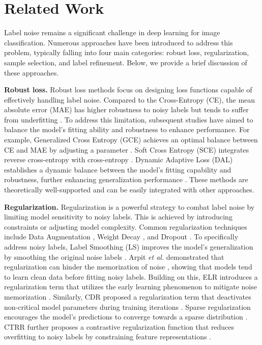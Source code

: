 \section{Related Work}
\label{sec2}
Label noise remains a significant challenge in deep learning for image classification. Numerous approaches have been introduced to address this problem, typically falling into four main categories: robust loss, regularization, sample selection, and label refinement. Below, we provide a brief discussion of these approaches.

\textbf{Robust loss.} Robust loss methods focus on designing loss functions capable of effectively handling label noise. Compared to the Cross-Entropy (CE), the mean absolute error (MAE) has higher robustness to noisy labels but tends to suffer from underfitting \citep{ghosh2017robust}. To address this limitation, subsequent studies have aimed to balance the model’s fitting ability and robustness to enhance performance. For example, Generalized Cross Entropy (GCE) achieves an optimal balance between CE and MAE by adjusting a parameter \citep{zhang2018generalized}. Soft Cross Entropy (SCE) integrates reverse cross-entropy with cross-entropy \citep{wang2019symmetric}. Dynamic Adaptive Loss (DAL) establishes a dynamic balance between the model’s fitting capability and robustness, further enhancing generalization performance \citep{li2023dynamics}. These methods are theoretically well-supported and can be easily integrated with other approaches.

\textbf{Regularization.} Regularization is a powerful strategy to combat label noise by limiting model sensitivity to noisy labels. This is achieved by introducing constraints or adjusting model complexity. Common regularization techniques include Data Augmentation \citep{shorten2019survey}, Weight Decay \citep{krogh1991simple}, and Dropout \citep{srivastava2014dropout}. To specifically address noisy labels, Label Smoothing (LS) improves the model’s generalization by smoothing the original noise labels \citep{szegedy2016rethinking}. Arpit \textit{et al.} demonstrated that regularization can hinder the memorization of noise \citep{arpit2017closer}, showing that models tend to learn clean data before fitting noisy labels. Building on this, ELR introduces a regularization term that utilizes the early learning phenomenon to mitigate noise memorization \citep{liu2020early}. Similarly, CDR proposed a regularization term that deactivates non-critical model parameters during training iterations \citep{xia2020robust}. Sparse regularization encourages the model’s predictions to converge towards a sparse distribution \citep{zhou2021learning}. CTRR further proposes a contrastive regularization function that reduces overfitting to noisy labels by constraining feature representations \citep{yi2022learning}.

